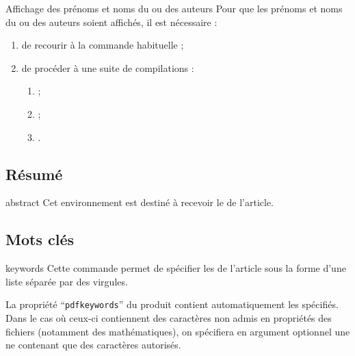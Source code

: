\documentclass[french,nolocaltoc]{nwejmart}
\newtheorem[title=Fait,style=definition]{fact}
\begin{document}
\begin{dbwarning}{Affichage des prénoms et noms du ou des auteurs}{}
  Pour que les prénoms et noms du ou des auteurs soient affichés, il est
  nécessaire :
  \begin{enumerate}
  \item de recourir à la commande habituelle  ;
  \item de procéder à une suite de compilations\suitecompilations{} :
    \begin{enumerate}
    \item {} ;
    \item {} ;
    \item {}.
    \end{enumerate}
  \end{enumerate}
\end{dbwarning}

\subsection{Résumé}
\label{sec-resume}

\begin{docEnvironment}[doc description=\mandatory,doclang/environment content=résumé]{abstract}{}
  Cet environnement est destiné à recevoir le  de l'article.
\end{docEnvironment}

\subsection{Mots clés}

\begin{docCommand}[doc description=\mandatory]{keywords}{}
  Cette commande permet de spécifier les  de l'article sous la
  forme d'une liste séparée par des virgules.

  La propriété \enquote{\texttt{pdfkeywords}} du  produit contient
  automatiquement les  spécifiés. Dans le cas où ceux-ci
  contiennent des caractères non admis en propriétés des fichiers 
  (notamment des mathématiques), on spécifiera en argument optionnel une
   ne contenant que des caractères autorisés.
\end{docCommand}

\begin{bodycode}[listing options={deletekeywords={keywords}}]
\end{bodycode}
\end{document}
